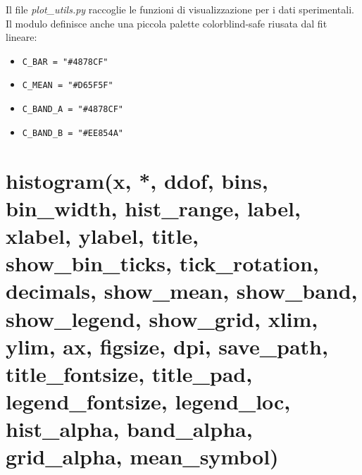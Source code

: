 \vspace{-8pt}
Il file \textit{plot\_utils.py} raccoglie le funzioni di visualizzazione per i dati sperimentali. Il modulo definisce anche una piccola palette colorblind-safe riusata dal fit lineare:

\begin{itemize}
    \item \texttt{C\_BAR = "\#4878CF"}
    \item \texttt{C\_MEAN = "\#D65F5F"}
    \item \texttt{C\_BAND\_A = "\#4878CF"}
    \item \texttt{C\_BAND\_B = "\#EE854A"}
\end{itemize}

\section{\texorpdfstring{histogram(x, *, ddof, bins, bin\_width, hist\_range, label, xlabel, ylabel, title, show\_bin\_ticks, tick\_rotation, decimals, show\_mean, show\_band, show\_legend, show\_grid, xlim, ylim, ax, figsize, dpi, save\_path, title\_fontsize, title\_pad, legend\_fontsize, legend\_loc, hist\_alpha, band\_alpha, grid\_alpha, mean\_symbol)}{histogram(x, *, ddof, bins, bin_width, hist_range, label, xlabel, ylabel, title, show_bin_ticks, tick_rotation, decimals, show_mean, show_band, show_legend, show_grid, xlim, ylim, ax, figsize, dpi, save_path, title_fontsize, title_pad, legend_fontsize, legend_loc, hist_alpha, band_alpha, grid_alpha, mean_symbol)}}
\label{sec:istogramma}
